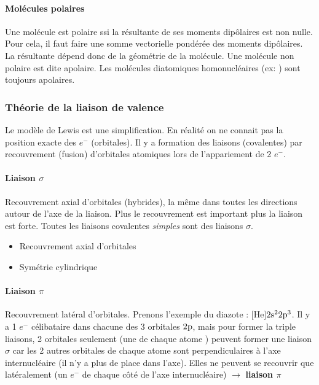 \paragraph{Molécules polaires}
Une molécule est polaire ssi la résultante de ses moments dipôlaires est non nulle.
Pour cela, il faut faire une somme vectorielle pondérée des moments dipôlaires.
La résultante dépend donc de la géométrie de la molécule.
Une molécule non polaire est dite apolaire.
Les molécules diatomiques homonucléaires (ex: ) sont toujours apolaires.

\subsubsection{Théorie de la liaison de valence}
Le modèle de Lewis est une simplification.
En réalité on ne connait pas la position exacte des $e^-$ (orbitales).
Il y a formation des liaisons (covalentes) par recouvrement (fusion) d'orbitales atomiques lors de l'appariement de 2 $e^-$.

\paragraph{Liaison $\sigma$}

Recouvrement axial d'orbitales (hybrides), la même dans toutes les directions autour de l'axe de la liaison.
Plus le recouvrement est important plus la liaison est forte.
Toutes les liaisons covalentes {\it simples} sont des liaisons $\sigma$.

\begin{itemize}
	\item Recouvrement axial d'orbitales
	\item Symétrie cylindrique
\end{itemize}

\paragraph{Liaison $\pi$}

Recouvrement latéral d'orbitales.
Prenons l'exemple du diazote : [He]$2\mathrm{s}^2 2\mathrm{p}^3$.
Il y a 1 $e^-$ célibataire dans chacune des 3 orbitales $2\mathrm{p}$,
mais pour former la triple liaisons,
2 orbitales seulement (une de chaque atome ) peuvent former une liaison $\sigma$ car les 2 autres orbitales de chaque atome sont perpendiculaires à l'axe internucléaire (il n'y a plus de place dans l'axe).
Elles ne peuvent se recouvrir que latéralement (un $e^-$ de chaque côté de l'axe internucléaire) $\rightarrow$ \textbf{liaison $\pi$}

